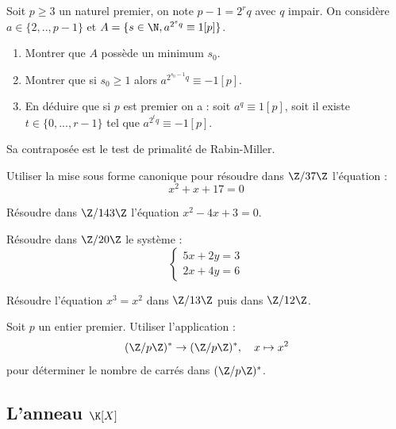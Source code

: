 \begin{exercice}
Soit $p\geqslant3$ un naturel premier, on note $p-1=2^{r}q$ avec $q$ impair. 
On considère $a\in\{2,..,p-1\}$ et $A=\{s\in\N, a^{2^{s}q}\equiv1[p]\}$. 
\begin{enumerate}
 \item Montrer que $A$ possède un minimum $s_{0}$. 
 \item Montrer que si $s_{0}\geqslant1$ alors $a^{2^{s_{0}-1}q}\equiv-1[p]$. 
 \item En déduire que si $p$ est premier on a : soit $a^{q}\equiv1[p]$, soit il existe $t\in\{0,...,r-1\}$ tel que $a^{2^{t}q}\equiv-1[p]$. 
\end{enumerate}
Sa contraposée est le test de primalité de Rabin-Miller. 
\end{exercice}

\begin{exercice}
Utiliser la mise sous forme canonique pour résoudre dans $\Z/37\Z$ l'équation :
\[x^{2}+x+17=0\]
\end{exercice}

\begin{exercice}
Résoudre dans $\Z/143\Z$ l'équation $x^{2}-4x+3=0$. 
\end{exercice}

\begin{exercice}
Résoudre dans $\Z/20\Z$ le système :
\[\begin{cases}5x+2y=3\\ 2x+4y=6\end{cases}\]
\end{exercice}

\begin{exercice}
Résoudre l'équation $x^{3}=x^{2}$ dans $\Z/13\Z$ puis dans $\Z/12\Z$. 
\end{exercice}

\begin{exercice}
Soit $p$ un entier premier. Utiliser l'application :
\[(\Z/p\Z)^{*}\rightarrow(\Z/p\Z)^{*}, \quad x \mapsto x^2\]
pour déterminer le nombre de carrés dans $(\Z/p\Z)^{*}$. 
\end{exercice}

\subsection{L'anneau \texorpdfstring{$\K[X]$}{K[X]}}

